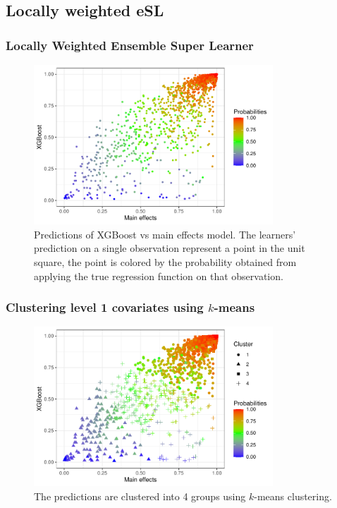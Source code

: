 \documentclass{beamer}
\begin{document}
\subsection{Locally weighted eSL}
\begin{frame}
    \frametitle{Locally Weighted Ensemble Super Learner} 
    \begin{figure}[H]
        \centering
        \includegraphics[width=0.8\textwidth]{figures/esl_preds_xgboost_vs_main.pdf}
        \caption{Predictions of XGBoost vs main effects model. The learners' prediction on a single observation represent a point in the unit square, the point is colored by the probability obtained from applying the true regression function on that observation.}
        \label{fig:esl_preds_xgboost_vs_main}
    \end{figure}
\end{frame}

\begin{frame}
    \frametitle{Clustering level 1 covariates using $ k $-means} 
    \begin{figure}[H]
        \centering
        \includegraphics[width=0.8\textwidth]{figures/esl_preds_xgboost_vs_main_kmeans.pdf}
    \caption{The predictions are clustered into 4 groups using $ k $-means clustering.}
        \label{fig:esl_preds_xgboost_vs_main_kmeans}
    \end{figure}
\end{frame}
\end{document}

